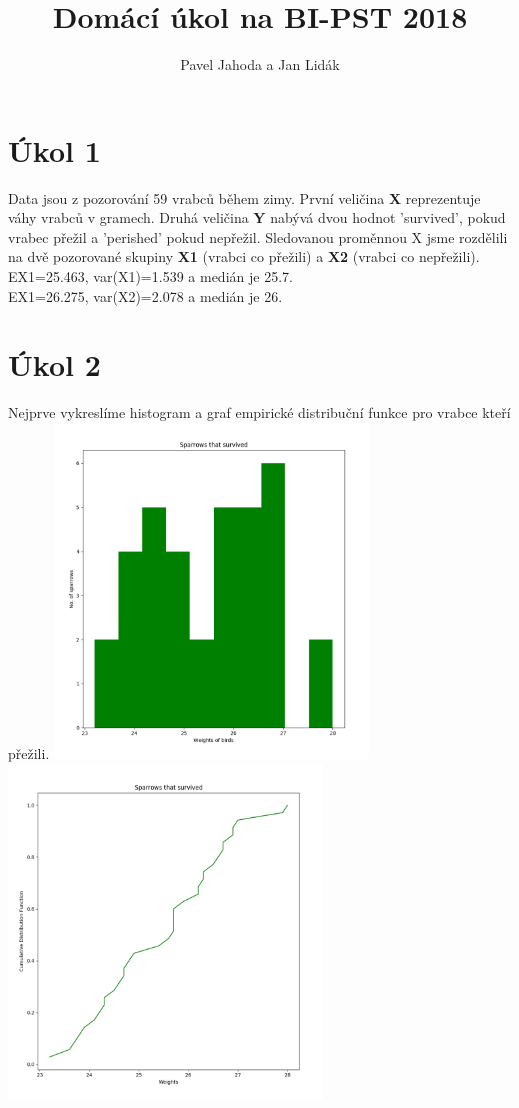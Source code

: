 \documentclass[12pt,a4paper]{article}
\begin{document}
\title{\LARGE \bf Domácí úkol na BI-PST 2018}
 \author{Pavel Jahoda a Jan Lidák}

\maketitle

\section{Úkol 1}
Data jsou z pozorování 59 vrabců během zimy. První veličina {\bf X} reprezentuje váhy vrabců v gramech. Druhá veličina {\bf Y} nabývá dvou hodnot 'survived', pokud vrabec přežil a 'perished' pokud nepřežil. Sledovanou proměnnou X jsme rozdělili na dvě pozorované skupiny {\bf X1} (vrabci co přežili) a {\bf X2} (vrabci co nepřežili).\\
EX1=25.463, var(X1)=1.539 a medián je 25.7.\\
EX1=26.275, var(X2)=2.078 a medián je 26.\\
\par \bigskip

\section{Úkol 2}
Nejprve vykreslíme histogram a graf empirické distribuční funkce pro vrabce kteří přežili. 
\includegraphics[height=3.5in]{survivedHist}
\includegraphics[height=3.5in]{survivedDist}
\end{document}
